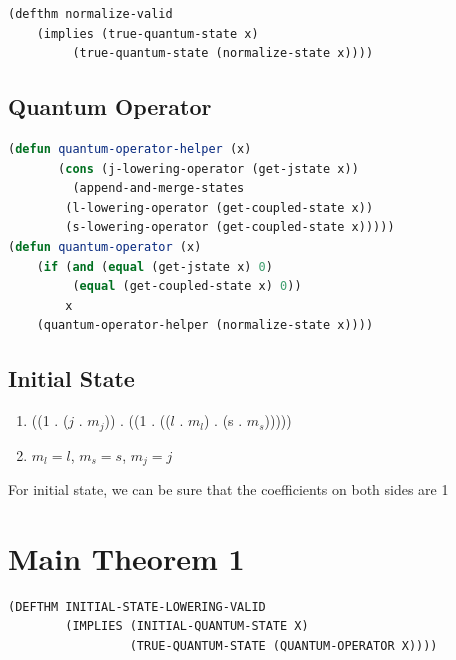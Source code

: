 \documentclass[
paper=128mm:96mm, %
fontsize=11pt, %
pagesize, %
parskip=half-, %
]{scrartcl} %
\theoremstyle{mythmstyle} %
\begin{document}
\begin{lstlisting}[language=Lisp,breaklines=true]
(defthm normalize-valid
	(implies (true-quantum-state x)
		 (true-quantum-state (normalize-state x))))
\end{lstlisting}

\clearpage

\subsection{Quantum Operator}

\begin{lstlisting}[language=Lisp,breaklines=true]
(defun quantum-operator-helper (x)
       (cons (j-lowering-operator (get-jstate x))
	     (append-and-merge-states 
		(l-lowering-operator (get-coupled-state x))
		(s-lowering-operator (get-coupled-state x)))))
(defun quantum-operator (x)
	(if (and (equal (get-jstate x) 0)
		 (equal (get-coupled-state x) 0))
	    x
	(quantum-operator-helper (normalize-state x))))
\end{lstlisting}

\clearpage


\subsection{Initial State}

\begin{enumerate}

\item ((1 . ($j$ . $m_j$)) . ((1 . (($l$ . $m_l$) . (s . $m_s$)))))

\item $m_l= l$, $m_s=s$, $m_j = j$

\end{enumerate}

For initial state, we can be sure that the coefficients on both sides are 1

\clearpage

\section{Main Theorem 1}

\begin{lstlisting}[language=Lisp,breaklines=true]
(DEFTHM INITIAL-STATE-LOWERING-VALID
        (IMPLIES (INITIAL-QUANTUM-STATE X)
                 (TRUE-QUANTUM-STATE (QUANTUM-OPERATOR X))))
\end{lstlisting}
\end{document}
